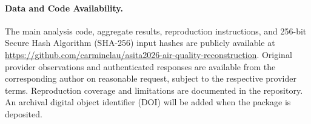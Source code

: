 \paragraph{Data and Code Availability.}
The main analysis code, aggregate results, reproduction instructions, and
256-bit Secure Hash Algorithm (SHA-256) input hashes are publicly available at
\url{https://github.com/carminelau/asita2026-air-quality-reconstruction}.
Original provider observations and authenticated responses are available
from the corresponding author on reasonable request, subject to the
respective provider terms. Reproduction coverage and limitations are
documented in the repository. An archival digital object identifier (DOI)
will be added when the package is deposited.
